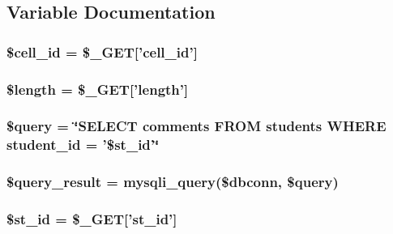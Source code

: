 \subsection{\-Variable \-Documentation}
\hypertarget{showText_8php_a61dea27fb42757cdaae37a86b848807c}{
\subsubsection[{\$cell\-\_\-id}]{\setlength{\rightskip}{0pt plus 5cm}\$cell\-\_\-id = \$\-\_\-\-G\-E\-T\mbox{[}'cell\-\_\-id'\mbox{]}}}\label{showText_8php_a61dea27fb42757cdaae37a86b848807c}
\hypertarget{showText_8php_adf14d8e29912c1855022dfa252aa4087}{
\subsubsection[{\$length}]{\setlength{\rightskip}{0pt plus 5cm}\$length = \$\-\_\-\-G\-E\-T\mbox{[}'length'\mbox{]}}}\label{showText_8php_adf14d8e29912c1855022dfa252aa4087}
\hypertarget{showText_8php_af59a5f7cd609e592c41dc3643efd3c98}{
\subsubsection[{\$query}]{\setlength{\rightskip}{0pt plus 5cm}\$query = \char`\"{}\-S\-E\-L\-E\-C\-T comments \-F\-R\-O\-M students \-W\-H\-E\-R\-E student\-\_\-id = '\$st\-\_\-id'\char`\"{}}}\label{showText_8php_af59a5f7cd609e592c41dc3643efd3c98}
\hypertarget{showText_8php_ade0b3dacf5d65d8f2293ffa78561fe31}{
\subsubsection[{\$query\-\_\-result}]{\setlength{\rightskip}{0pt plus 5cm}\$query\-\_\-result = mysqli\-\_\-query(\$dbconn, \$query)}}\label{showText_8php_ade0b3dacf5d65d8f2293ffa78561fe31}
\hypertarget{showText_8php_ab68b86e23fd74e101c03130a49b24f66}{
\subsubsection[{\$st\-\_\-id}]{\setlength{\rightskip}{0pt plus 5cm}\$st\-\_\-id = \$\-\_\-\-G\-E\-T\mbox{[}'st\-\_\-id'\mbox{]}}}\label{showText_8php_ab68b86e23fd74e101c03130a49b24f66}
